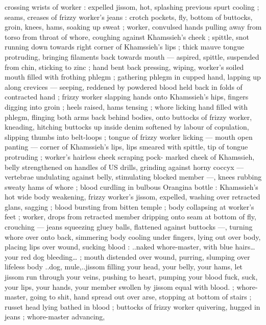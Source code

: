 crossing wrists of worker : expelled jissom, hot, splashing previous 
spurt cooling ; seams, creases of frizzy worker's jeans : crotch 
pockets, fly, bottom of buttocks, groin, knees, hams, soaking up 
sweat ; worker, convulsed hands pulling away from torso from throat 
of whore, coughing against Khamssieh's cheek ; spittle, snot 
running down towards right corner of Khamssieh's lips ; thick mauve 
tongue protruding, bringing filaments back towards mouth --- 
aspired, spittle, suspended from chin, sticking to zinc ; hand bent 
back pressing, wiping, worker's soiled mouth filled with frothing 
phlegm ; gathering phlegm in cupped hand, lapping up along 
crevices --- seeping, reddened by powdered blood held back in folds 
of contracted hand ; frizzy worker slapping hands onto Khamssieh's 
hips, fingers digging into groin ; heels raised, hams tensing ; whore 
licking hand filled with phlegm, flinging both arms back behind 
bodies, onto buttocks of frizzy worker, kneading, hitching buttocks 
up inside denim softened by labour of copulation, slipping thumbs 
into belt-loops ; tongue of frizzy worker licking --- mouth open 
panting --- corner of Khamssieh's lips, lips smeared with spittle, tip 
of tongue protruding ; worker's hairless cheek scraping pock- 
marked cheek of Khamssieh, belly strengthened on handles of US 
drills, grinding against horny coccyx --- vertebrae undulating against 
belly, stimulating blocked member ---, knees rubbing sweaty hams of 
whore ; blood curdling in bulbous Orangina bottle : Khamssieh's hot 
wide body weakening, frizzy worker's jissom, expelled, washing over 
retracted glans, sagging ; blood bursting from bitten temple ; body 
collapsing at worker's feet ; worker, drops from retracted member 
dripping onto seam at bottom of fly, crouching --- jeans squeezing 
gluey balls, flattened against buttocks ---, turning whore over onto 
back, simmering body cooling under fingers, lying out over body, 
placing lips over wound, sucking blood : {\gl}..naked whore-master, with 
blue hairs{\ldots} your red dog bleeding{\ldots}{\gr} ; mouth distended over wound, 
purring, slumping over lifeless body{\td} {\gl}..dog, mule,..jissom filling 
your head, your belly, your hams, let jissom run through your veins, 
pushing to heart, pumping your blood{\td} fuck, suck, your lips, your 
hands, your member swollen by jissom equal with blood.{\gr} ; whore- 
master, going to shit, hand spread out over arse, stopping at bottom 
of stairs ; russet head lying bathed in blood ; buttocks of frizzy 
worker quivering, hugged in jeans ; whore-master advancing, 
